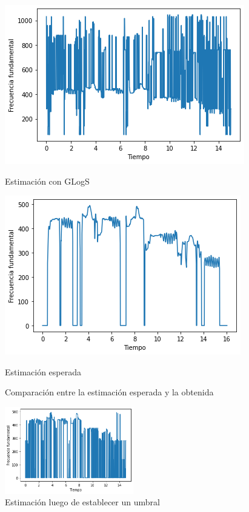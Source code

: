 \documentclass[a4paper]{article}
\begin{document}
\begin{figure}[!h]
\begin{minipage}[b]{0.5\linewidth}
\centering
\includegraphics[width=\linewidth]{GLogS.png}
\caption{Estimación con GLogS}
\label{glogs}
\end{minipage}
\hspace{0.5cm}
\begin{minipage}[b]{0.5\linewidth}
\centering
\includegraphics[width=\linewidth]{true.png}
\caption{Estimación esperada}
\label{true}
\end{minipage}
\caption{Comparación entre la estimación esperada y la obtenida }
\label{comparacion1}
\end{figure}

\begin{figure}[h!]
\centering
\includegraphics[width=0.5\textwidth]{post.png}
\caption{Estimación luego de establecer un umbral}
\label{post}
\end{figure}
\end{document}
